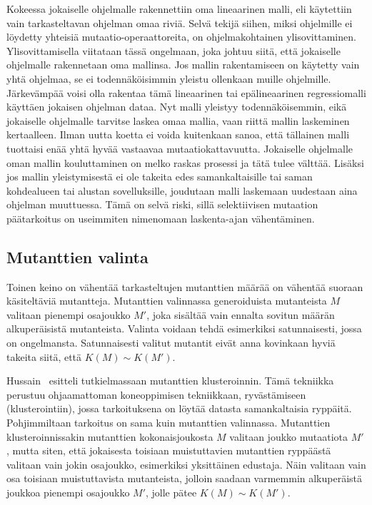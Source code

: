 \documentclass[finnish]{tktltiki2}
\begin{document}
Kokeessa jokaiselle ohjelmalle rakennettiin oma lineaarinen malli, eli käytettiin vain tarkasteltavan ohjelman omaa riviä. Selvä tekijä siihen, miksi ohjelmille ei löydetty yhteisiä mu\-taa\-tio\--ope\-raatto\-reita, on ohjelmakohtainen ylisovittaminen. Ylisovittamisella viitataan tässä ongelmaan, joka johtuu siitä, että jokaiselle ohjelmalle rakennetaan oma mallinsa. Jos mallin rakentamiseen on käytetty vain yhtä ohjelmaa, se ei todennäköisimmin yleistu ollenkaan muille ohjelmille. Järkevämpää voisi olla rakentaa tämä lineaarinen tai epälineaarinen regressiomalli käyttäen jokaisen ohjelman dataa. Nyt malli yleistyy todennäköisemmin, eikä jokaiselle ohjelmalle tarvitse laskea omaa mallia, vaan riittä mallin laskeminen kertaalleen. Ilman uutta koetta ei voida kuitenkaan sanoa, että tällainen malli tuottaisi enää yhtä hyvää vastaavaa mutaatiokattavuutta. Jokaiselle ohjelmalle oman mallin kouluttaminen on melko raskas prosessi ja tätä tulee välttää. Lisäksi jos mallin yleistymisestä ei ole takeita edes samankaltaisille tai saman kohdealueen tai alustan sovelluksille, joudutaan malli laskemaan uudestaan aina ohjelman muuttuessa. Tämä on selvä riski, sillä selektiivisen mutaation päätarkoitus on useimmiten nimenomaan laskenta-ajan vähentäminen.

\subsection{Mutanttien valinta}
Toinen keino on vähentää tarkasteltujen mutanttien määrää on vähentää suoraan käsiteltäviä mutantteja. Mutanttien valinnassa generoiduista mutanteista $M$ valitaan pienempi osajoukko $M'$, joka sisältää vain ennalta sovitun määrän alkuperäisistä mutanteista. Valinta voidaan tehdä esimerkiksi satunnaisesti, jossa on ongelmansta. Satunnaisesti valitut mutantit eivät anna kovinkaan hyviä takeita siitä, että $K(M) \sim K(M')$. 

Hussain~\cite{Hussain08} esitteli tutkielmassaan mutanttien klusteroinnin. Tämä tekniikka perustuu ohjaamattoman koneoppimisen tekniikkaan, ryvästämiseen (klusterointiin), jossa tarkoituksena on löytää datasta samankaltaisia ryppäitä. Pohjimmiltaan tarkoitus on sama kuin mutanttien valinnassa. Mutanttien klusteroinnissakin mutanttien kokonaisjoukosta $M$ valitaan joukko mutaatiota $M'$, mutta siten, että jokaisesta toisiaan muistuttavien mutanttien ryppäästä valitaan vain jokin osajoukko, esimerkiksi yksittäinen edustaja. Näin valitaan vain osa toisiaan muistuttavista mutanteista, jolloin saadaan varmemmin alkuperäistä joukkoa pienempi osajoukko $M'$, jolle pätee $K(M) \sim K(M')$. 
\end{document}
